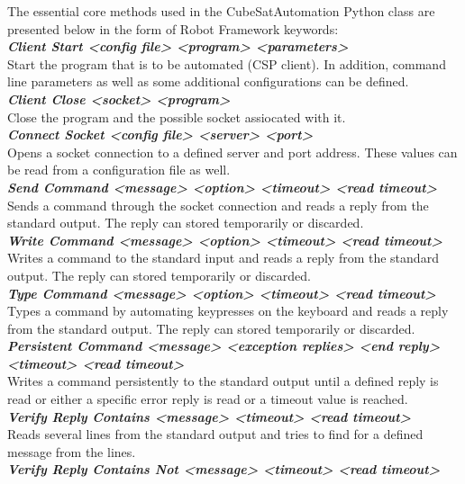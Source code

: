 \documentclass[english,12pt,a4paper,pdftex,elec,utf8]{aaltothesis}
\begin{document}
The essential core methods used in the CubeSatAutomation Python class are presented below in the form of Robot Framework keywords:\\
\textit{\textbf{Client Start  <config file> <program> <parameters>}}\\
Start the program that is to be automated (CSP client). In addition, command line parameters as well as some additional configurations can be defined.\\
\textit{\textbf{Client Close <socket> <program>}}\\
Close the program and the possible socket assiocated with it.\\
\textit{\textbf{Connect Socket <config file> <server> <port>}}\\
Opens a socket connection to a defined server and port address. These values can be read from a configuration file as well.\\
\textit{\textbf{Send Command  <message> <option> <timeout> <read timeout>}}\\
Sends a command through the socket connection and reads a reply from the standard output. The reply can stored temporarily or discarded.\\
\textit{\textbf{Write Command  <message> <option> <timeout> <read timeout>}}\\
Writes a command to the standard input and reads a reply from the standard output. The reply can stored temporarily or discarded.\\
\textit{\textbf{Type Command  <message> <option> <timeout> <read timeout>}}\\
Types a command by automating keypresses on the keyboard and reads a reply from the standard output. The reply can stored temporarily or discarded. \\
\textit{\textbf{Persistent Command  <message> <exception replies> <end reply> <timeout> <read timeout>}}\\
Writes a command persistently to the standard output until a defined reply is read or either a specific error reply is read or a timeout value is reached.\\
\textit{\textbf{Verify Reply Contains  <message> <timeout> <read timeout>}}\\
Reads several lines from the standard output and tries to find for a defined message from the lines.\\
\textit{\textbf{Verify Reply Contains Not  <message> <timeout> <read timeout>}}\\
\end{document}
